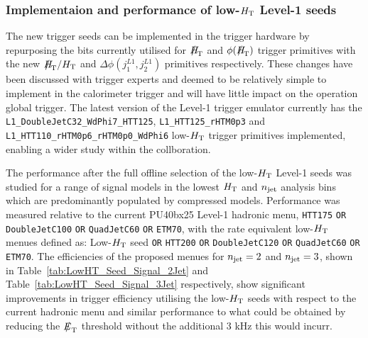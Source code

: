 \subsubsection{Implementaion and performance of low-$\mbox{$H_\text{T}$}$ Level-1 seeds}

The new trigger seeds can be implemented in the trigger hardware by repurposing the bits currently utilised for $\mht$ and $\phi({\mht})$ trigger primitives with the new $\mht/\scalht$ and $\Delta\phi(j_{1}^{L1},j_{2}^{L1})$ primitives respectively. These changes have been discussed with trigger experts and deemed to be relatively simple to implement in the calorimeter trigger and will have little impact on the operation global trigger. The latest version of the Level-1 trigger emulator currently has the \verb!L1_DoubleJetC32_WdPhi7_HTT125!, \verb!L1_HTT125_rHTM0p3! and \\ \verb!L1_HTT110_rHTM0p6_rHTM0p0_WdPhi6! low-$\mbox{$H_\text{T}$}$ trigger primitives implemented, enabling a wider study within the collboration.

The performance after the full offline selection of the low-$\mbox{$H_\text{T}$}$ Level-1 seeds was studied for a range of signal models in the lowest $\mbox{$H_\text{T}$}$ and $n_{\text{jet}}$ analysis bins which are predominantly populated by compressed models. Performance was measured relative to the current PU40bx25 Level-1 hadronic menu, {\verb!HTT175! \verb!OR! \verb!DoubleJetC100! \verb!OR! \verb!QuadJetC60! \verb!OR! \verb!ETM70!}, with the rate equivalent low-$\mbox{$H_\text{T}$}$ menues defined as: Low-$\mbox{$H_\text{T}$}$ seed {\verb!OR! \verb!HTT200! \verb!OR! \verb!DoubleJetC120! \verb!OR! \verb!QuadJetC60! \verb!OR! \verb!ETM70!}. The efficiencies of the proposed menues for $n_{\text{jet}} = 2$ and $n_{\text{jet}} = 3$, shown in Table~\ref{tab:LowHT_Seed_Signal_2Jet} and Table~\ref{tab:LowHT_Seed_Signal_3Jet} respectively, show significant improvements in trigger efficiency utilising the low-$\mbox{$H_\text{T}$}$ seeds with respect to the current hadronic menu and similar performance to what could be obtained by reducing the $\met$ threshold without the additional 3 kHz this would incurr.



